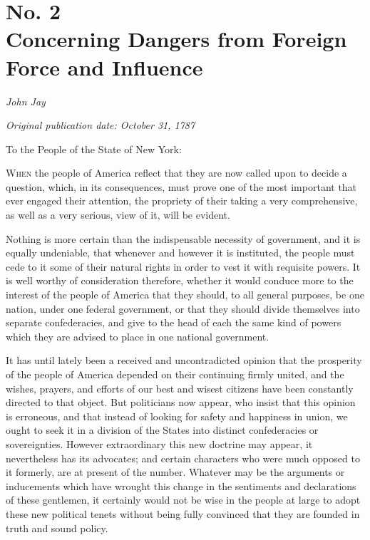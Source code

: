 \chapter[No. 2: Concerning Dangers from Foreign Force and Influence]{No. 2\\ {\small Concerning Dangers from Foreign Force and Influence}}

\textit{John Jay}

\textit{Original publication date: October 31, 1787}
\vspace{1cm}

To the People of the State of New York:
\vspace{.4cm}

\textsc{When} the people of America reflect that they are now called upon to decide a question, which, in its consequences, must prove one of the most important that ever engaged their attention, the propriety of their taking a very comprehensive, as well as a very serious, view of it, will be evident.

Nothing is more certain than the indispensable necessity of government, and it is equally undeniable, that whenever and however it is instituted, the people must cede to it some of their natural rights in order to vest it with requisite powers. 
It is well worthy of consideration therefore, whether it would conduce more to the interest of the people of America that they should, to all general purposes, be one nation, under one federal government, or that they should divide themselves into separate confederacies, and give to the head of each the same kind of powers which they are advised to place in one national government.

It has until lately been a received and uncontradicted opinion that the prosperity of the people of America depended on their continuing firmly united, and the wishes, prayers, and efforts of our best and wisest citizens have been constantly directed to that object. 
But politicians now appear, who insist that this opinion is erroneous, and that instead of looking for safety and happiness in union, we ought to seek it in a division of the States into distinct confederacies or sovereignties. 
However extraordinary this new doctrine may appear, it nevertheless has its advocates; and certain characters who were much opposed to it formerly, are at present of the number. 
Whatever may be the arguments or inducements which have wrought this change in the sentiments and declarations of these gentlemen, it certainly would not be wise in the people at large to adopt these new political tenets without being fully convinced that they are founded in truth and sound policy.

